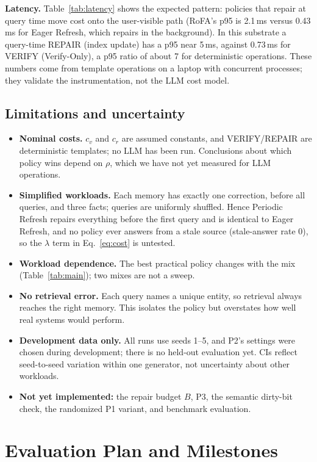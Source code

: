\documentclass{article}
\begin{document}
\textbf{Latency.} Table~\ref{tab:latency} shows the expected pattern: policies
that repair at query time move cost onto the user-visible path (RoFA's p95 is
2.1\,ms versus 0.43\,ms for Eager Refresh, which repairs in the background).
In this substrate a query-time REPAIR (index update) has a p95 near 5\,ms,
against 0.73\,ms for VERIFY (Verify-Only), a p95 ratio of about 7 for
deterministic operations. These numbers come
from template operations on a laptop with concurrent processes; they validate
the instrumentation, not the LLM cost model.

\subsection{Limitations and uncertainty}
\begin{itemize}
\item \textbf{Nominal costs.} $c_v$ and $c_r$ are assumed constants, and
VERIFY/REPAIR are deterministic templates; no LLM has been run. Conclusions
about which policy wins depend on $\rho$, which we have not yet measured for
LLM operations.
\item \textbf{Simplified workloads.} Each memory has exactly one correction,
before all queries, and three facts; queries are uniformly shuffled. Hence
Periodic Refresh repairs everything before the first query and is identical
to Eager Refresh, and no policy ever answers from a stale source (stale-answer
rate 0), so the $\lambda$ term in Eq.~\ref{eq:cost} is untested.
\item \textbf{Workload dependence.} The best practical policy changes with
the mix (Table~\ref{tab:main}); two mixes are not a sweep.
\item \textbf{No retrieval error.} Each query names a unique entity, so
retrieval always reaches the right memory. This isolates the policy
but overstates how well real systems would perform.
\item \textbf{Development data only.} All runs use seeds 1--5, and P2's
settings were chosen during development; there is no held-out evaluation yet.
CIs reflect seed-to-seed variation within one generator, not uncertainty
about other workloads.
\item \textbf{Not yet implemented:} the repair budget $B$, P3, the semantic
dirty-bit check, the randomized P1 variant, and benchmark evaluation.
\end{itemize}

\section{Evaluation Plan and Milestones}
\label{sec:plan}
\end{document}
